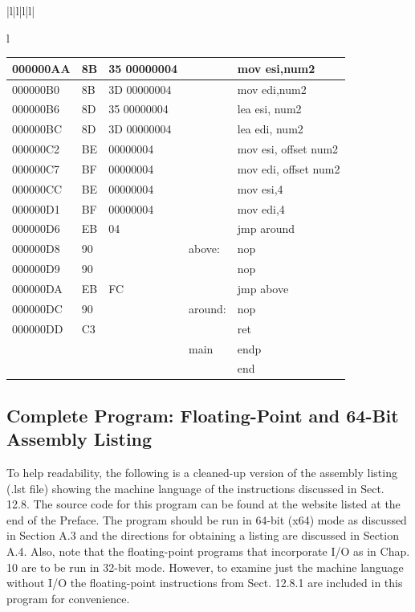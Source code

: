 \documentclass[10pt]{book}
\begin{document}
\begin{center}
\begin{tabular}{|l|l|l|l|}
\begin{tabular}{l}
\begin{center}
\begin{tabular}{|l|l|l|l|l|}
\hline
000000AA & 8B & 35 00000004 &  & mov esi,num2 \\
\hline
000000B0 & 8B & 3D 00000004 &  & mov edi,num2 \\
\hline
000000B6 & 8D & 35 00000004 &  & lea esi, num2 \\
\hline
000000BC & 8D & 3D 00000004 &  & lea edi, num2 \\
\hline
000000C2 & BE & 00000004 &  & mov esi, offset num2 \\
\hline
000000C7 & BF & 00000004 &  & mov edi, offset num2 \\
\hline
000000CC & BE & 00000004 &  & mov esi,4 \\
\hline
000000D1 & BF & 00000004 &  & mov edi,4 \\
\hline
000000D6 & EB & 04 &  & jmp around \\
\hline
000000D8 & 90 &  & above: & nop \\
\hline
000000D9 & 90 &  &  & nop \\
\hline
000000DA & EB & FC &  & jmp above \\
\hline
000000DC & 90 &  & around: & nop \\
\hline
000000DD & C3 &  &  & ret \\
\hline
 &  &  & main & endp \\
\hline
 &  &  &  & end \\
\hline
\end{tabular}
\end{center}

\subsection{Complete Program: Floating-Point and 64-Bit Assembly Listing}
To help readability, the following is a cleaned-up version of the assembly listing (.lst file) showing the machine language of the instructions discussed in Sect. 12.8. The source code for this program can be found at the website listed at the end of the Preface. The program should be run in 64-bit (x64) mode as discussed in Section A.3 and the directions for obtaining a listing are discussed in Section A.4.
Also, note that the floating-point programs that incorporate I/O as in Chap. 10 are to be run in 32-bit mode. However, to examine just the machine language without I/O the floating-point instructions from Sect. 12.8.1 are included in this program for convenience.


\end{tabular}
\end{tabular}
\end{center}
\end{document}
